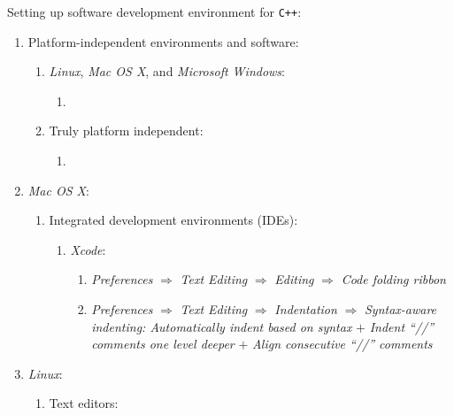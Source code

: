 Setting up software development environment for {\tt C++}: \vspace{-0.3cm}
\begin{enumerate} \itemsep -4pt
\item Platform-independent environments and software: \vspace{-0.3cm}
	\begin{enumerate} \itemsep -2pt
	\item {\it Linux}, {\it Mac OS X}, and {\it Microsoft Windows}: \vspace{-0.2cm}
		\begin{enumerate} \itemsep -2pt
		\item 
		\end{enumerate}
	\item Truly platform independent: \vspace{-0.2cm}
		\begin{enumerate} \itemsep -2pt
		\item 
		\end{enumerate}
	\end{enumerate}
\item {\it Mac OS X}: \vspace{-0.3cm}
	\begin{enumerate} \itemsep -2pt
	\item Integrated development environments (IDEs): \vspace{-0.2cm}
		\begin{enumerate} \itemsep -2pt
		\item {\it Xcode}: \vspace{-0.1cm}
			\begin{enumerate} \itemsep -1pt
			\item {\it Preferences} $\Longrightarrow$ {\it Text Editing} $\Longrightarrow$ {\it Editing} $\Longrightarrow$ {\it Code folding ribbon}
			\item {\it Preferences} $\Longrightarrow$ {\it Text Editing} $\Longrightarrow$ {\it Indentation} $\Longrightarrow$ {\it Syntax-aware indenting: Automatically indent based on syntax} $+$ {\it Indent ``//'' comments one level deeper} $+$ {\it Align consecutive ``//'' comments}
			\end{enumerate}
		\end{enumerate}
	\end{enumerate}
\item {\it Linux}: \vspace{-0.3cm}
	\begin{enumerate} \itemsep -2pt
	\item Text editors: \vspace{-0.2cm}

\end{enumerate}
\end{enumerate}
